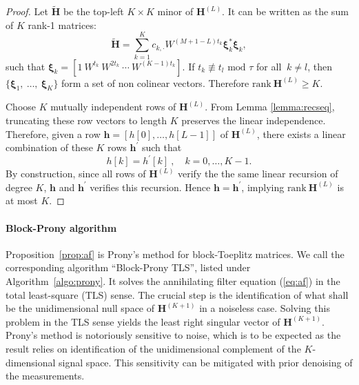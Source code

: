 \documentclass[journal,10pt]{IEEEtran}
\providecommand{\mat}[1]{\boldsymbol{#1}}
\providecommand{\vct}[1]{\boldsymbol{#1}}
\begin{document}
\begin{proof}
Let $\widetilde{\mat H}$ be the top-left $K\times K$ minor of $\mat H^{(L)}$. It can be written as the sum of $K$ rank-1 matrices:
$$\widetilde{\mat H}=\sum_{k=1}^K c_{k,\cdot} W^{(M+1-L)t_k}\vct \xi_k^\ast\vct\xi_k,$$
such that $\vct \xi_k=[1\ W^{t_k}\ W^{2t_k}\ \cdots \ W^{(K-1)t_k}]$. If $t_k\not\equiv t_l \text{ mod }\tau$ for all $\ k\neq l$, then $\lbrace\vct\xi_1,\ \dots,\ \vct\xi_K\rbrace$ form a set of non colinear vectors. Therefore  $\text{rank}\ \mat H^{(L)} \geq K$.

Choose $K$ mutually independent rows of $\mat H^{(L)}$. From  Lemma \ref{lemma:recseq}, truncating these row vectors to length $K$ preserves the linear independence. Therefore, given a row $\vct h =[h[0],\dots,h[L-1]]$ of $\mat H^{(L)}$, there exists a linear combination of these $K$ rows $\vct h^{\prime}$ such that
$$h[k]=h^\prime[k]\ , \quad k=0,\dots,K-1.$$
By construction, since all rows of $\mat H^{(L)}$ verify the the same linear recursion of degree $K$, $\vct h$ and $\vct h^\prime$ verifies this recursion. Hence $\vct h=\vct h^\prime$, implying $\text{rank}\ \mat H^{(L)}$ is at most $K$.
\end{proof}
\paragraph{Block-Prony algorithm} 
Proposition~\ref{prop:af} is Prony's method \cite{Prony1795,Tufts1982} for block-Toeplitz matrices.
We call the corresponding algorithm ``Block-Prony TLS'', listed under Algorithm~\ref{algo:prony}. It solves the annihilating filter equation (\ref{eq:af}) in the total least-square (TLS) sense. The crucial step is the identification of what shall be the unidimensional null space of $\mat H^{(K+1)}$ in a noiseless case. Solving this problem in the TLS sense yields the least right singular vector of $\mat H^{(K+1)}$. Prony's method is notoriously sensitive to noise, which is to be expected as the result relies on identification of the unidimensional complement of the $K$-dimensional signal space. This sensitivity can be mitigated with prior denoising of the measurements.
\end{document}
